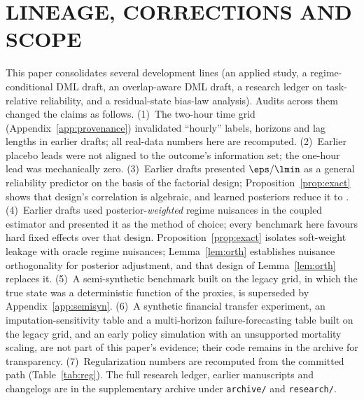 \section{LINEAGE, CORRECTIONS AND SCOPE}
\label{app:lineage}
This paper consolidates several development lines (an applied study, a regime-conditional DML draft, an overlap-aware DML draft, a research ledger on task-relative reliability, and a residual-state bias-law analysis). Audits across them changed the claims as follows. (1)~The two-hour time grid (Appendix~\ref{app:provenance}) invalidated ``hourly'' labels, horizons and lag lengths in earlier drafts; all real-data numbers here are recomputed. (2)~Earlier placebo leads were not aligned to the outcome's information set; the one-hour lead was mechanically zero. (3)~Earlier drafts presented $\eps/\lmin$ as a general reliability predictor on the basis of the factorial design; Proposition~\ref{prop:exact} shows that design's correlation is algebraic, and learned posteriors reduce it to \LPRhoD. (4)~Earlier drafts used posterior-\emph{weighted} regime nuisances in the coupled estimator and presented it as the method of choice; every benchmark here favours hard fixed effects over that design. Proposition~\ref{prop:exact} isolates soft-weight leakage with oracle regime nuisances; Lemma~\ref{lem:orth} establishes nuisance orthogonality for posterior adjustment, and that design of Lemma~\ref{lem:orth} replaces it. (5)~A semi-synthetic benchmark built on the legacy grid, in which the true state was a deterministic function of the proxies, is superseded by Appendix~\ref{app:semisyn}. (6)~A synthetic financial transfer experiment, an imputation-sensitivity table and a multi-horizon failure-forecasting table built on the legacy grid, and an early policy simulation with an unsupported mortality scaling, are not part of this paper's evidence; their code remains in the archive for transparency. (7)~Regularization numbers are recomputed from the committed path (Table~\ref{tab:reg}). The full research ledger, earlier manuscripts and changelogs are in the supplementary archive under \texttt{archive/} and \texttt{research/}.
